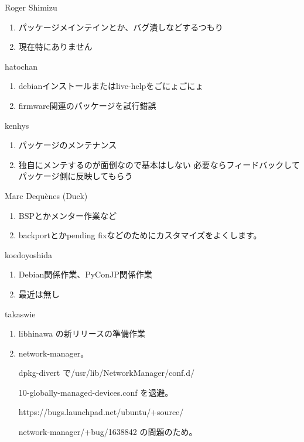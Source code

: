 \begin{prework}{ Roger Shimizu }
  \begin{enumerate}
  \item パッケージメインテインとか、バグ潰しなどするつもり
  \item 現在特にありません
  \end{enumerate}
\end{prework}

\begin{prework}{ hatochan }
  \begin{enumerate}
  \item debianインストールまたはlive-helpをごにょごにょ
  \item firmware関連のパッケージを試行錯誤
  \end{enumerate}
\end{prework}

\begin{prework}{ kenhys }
  \begin{enumerate}
  \item パッケージのメンテナンス
  \item 独自にメンテするのが面倒なので基本はしない 必要ならフィードバックしてパッケージ側に反映してもらう
  \end{enumerate}
\end{prework}

\begin{prework}{ Marc Dequ\`enes (Duck) }
  \begin{enumerate}
  \item BSPとかメンター作業など
  \item backportとかpending fixなどのためにカスタマイズをよくします。
  \end{enumerate}
\end{prework}

\begin{prework}{ koedoyoshida }
  \begin{enumerate}
  \item Debian関係作業、PyConJP関係作業
  \item 最近は無し
  \end{enumerate}
\end{prework}

\begin{prework}{ takaswie }
  \begin{enumerate}
  \item libhinawa の新リリースの準備作業
  \item network-manager。

    dpkg-divert で/usr/lib/NetworkManager/conf.d/

    10-globally-managed-devices.conf を退避。

    https://bugs.launchpad.net/ubuntu/+source/

    network-manager/+bug/1638842 の問題のため。
  \end{enumerate}
\end{prework}
